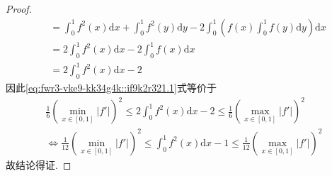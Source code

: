 \documentclass[../../main.tex]{subfiles}
\begin{document}
\begin{proof}
\begin{align*}
&= \int_0^1 f^2(x) \mathrm{d}x + \int_0^1 f^2(y) \mathrm{d}y - 2 \int_0^1 \left( f(x) \int_0^1 f(y) \mathrm{d}y \right) \mathrm{d}x \\
&= 2 \int_0^1 f^2(x) \mathrm{d}x - 2 \int_0^1 f(x) \mathrm{d}x \\
&= 2 \int_0^1 f^2(x) \mathrm{d}x - 2
\end{align*}
因此\eqref{eq:fwr3-vke9-kk34g4k::if9k2r321.1}式等价于
\begin{align*}
\frac{1}{6} \left( \min\limits_{x\in[0,1]} |f'| \right)^2 \leqslant 2 \int_0^1 f^2(x) \mathrm{d}x - 2 \leqslant \frac{1}{6} \left( \max\limits_{x\in[0,1]} |f'| \right)^2 \\
\Longleftrightarrow \frac{1}{12} \left( \min\limits_{x\in[0,1]} |f'| \right)^2 \leqslant \int_0^1 f^2(x) \mathrm{d}x - 1 \leqslant \frac{1}{12} \left( \max\limits_{x\in[0,1]} |f'| \right)^2
\end{align*}
故结论得证.

\end{proof}
\end{document}
